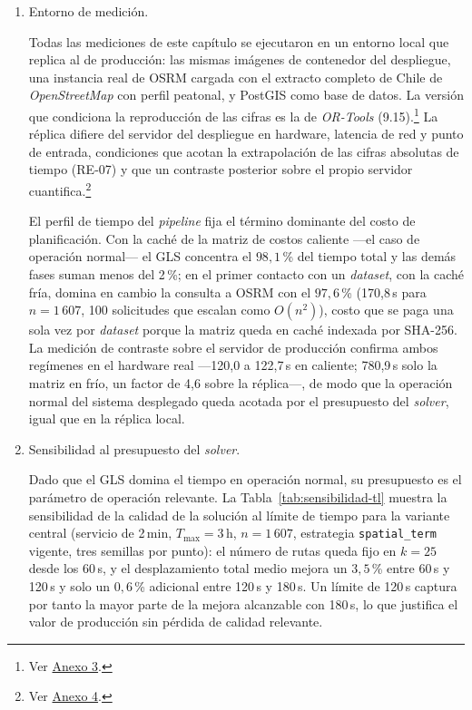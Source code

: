 \begin{enumerate}
\item Entorno de medición.

Todas las mediciones de este capítulo se ejecutaron en un entorno local que replica al de
producción: las mismas imágenes de contenedor del despliegue, una instancia real de OSRM cargada
con el extracto completo de Chile de \textit{OpenStreetMap} con perfil peatonal, y PostGIS como
base de datos. La versión que condiciona la reproducción de las cifras es la de \textit{OR-Tools}
(9.15).\footnote{Ver \hyperref[anx:comandos]{Anexo 3}.} La réplica difiere del servidor del
despliegue en hardware, latencia de red y punto de entrada, condiciones que acotan la
extrapolación de las cifras absolutas de tiempo (RE-07) y que un contraste posterior sobre el
propio servidor cuantifica.\footnote{Ver \hyperref[anx:perfil-rendimiento]{Anexo 4}.}

El perfil de tiempo del \textit{pipeline} fija el término dominante del costo de planificación.
Con la caché de la matriz de costos caliente ---el caso de operación normal--- el GLS concentra el
$98{,}1$\,\% del tiempo total y las demás fases suman menos del 2\,\%; en el primer contacto con un
\textit{dataset}, con la caché fría, domina en cambio la consulta a OSRM con el $97{,}6$\,\%
(170{,}8\,s para $n=1\,607$, 100 solicitudes que escalan como $O(n^2)$), costo que se paga una sola
vez por \textit{dataset} porque la matriz queda en caché indexada por SHA-256. La medición de
contraste sobre el servidor de producción confirma ambos regímenes en el hardware real ---120{,}0 a
122{,}7\,s en caliente; 780{,}9\,s solo la matriz en frío, un factor de 4{,}6 sobre la réplica---,
de modo que la operación normal del sistema desplegado queda acotada por el presupuesto del
\textit{solver}, igual que en la réplica local.

\item Sensibilidad al presupuesto del \textit{solver}.

Dado que el GLS domina el tiempo en operación normal, su presupuesto es el parámetro de operación
relevante. La Tabla~\ref{tab:sensibilidad-tl} muestra la sensibilidad de la calidad de la solución
al límite de tiempo para la variante central (servicio de 2\,min, $T_{\max}=3$\,h, $n=1\,607$,
estrategia \texttt{spatial\_term} vigente, tres semillas por punto): el número de rutas queda fijo en $k=25$ desde los 60\,s, y el
desplazamiento total medio mejora un $3{,}5$\,\% entre 60\,s y 120\,s y solo un $0{,}6$\,\%
adicional entre 120\,s y 180\,s. Un límite de 120\,s captura por tanto la mayor parte de la mejora
alcanzable con 180\,s, lo que justifica el valor de producción sin pérdida de calidad relevante.


\end{enumerate}

